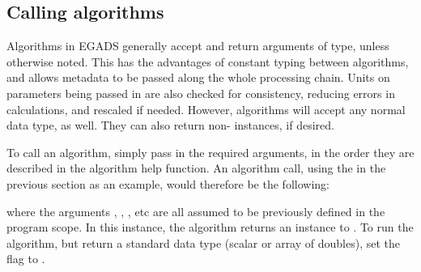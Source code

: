 \documentclass[a4paper,10pt,openany,english]{sphinxmanual}
\begin{document}
\subsection{Calling algorithms}
\label{tutorial:calling-algorithms}
Algorithms in EGADS generally accept and return arguments of {\hyperref[egadsapi:egads.core.egads_core.EgadsData]{}} type, unless otherwise noted. This has the advantages of constant typing between algorithms, and allows metadata to be passed along the whole processing chain. Units on parameters being passed in are also checked for consistency, reducing errors in calculations, and rescaled if needed. However, algorithms will accept any normal data type, as well. They can also return non-{\hyperref[egadsapi:egads.core.egads_core.EgadsData]{}} instances, if desired.

To call an algorithm, simply pass in the required arguments, in the order they are described in the algorithm help function. An algorithm call, using the  in the previous section as an example, would therefore be the following:

\begin{sphinxVerbatim}[commandchars=\\\{\}]
    
\end{sphinxVerbatim}

where the arguments , , , etc are all assumed to be previously defined in the program scope. In this instance, the algorithm returns an {\hyperref[egadsapi:egads.core.egads_core.EgadsData]{}} instance to . To run the algorithm, but return a standard data type (scalar or array of doubles), set the  flag to .

\begin{sphinxVerbatim}[commandchars=\\\{\}]
  
\end{sphinxVerbatim}
\end{document}
